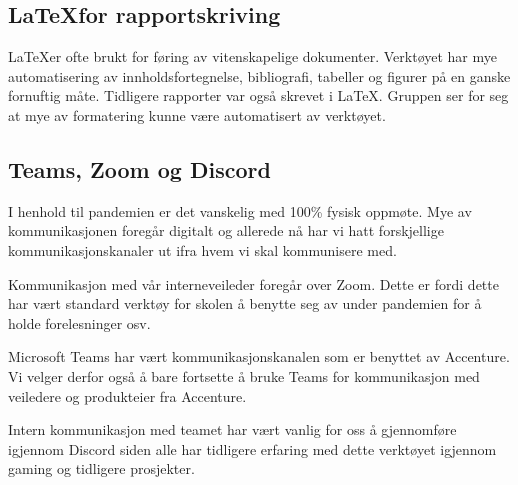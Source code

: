 \subsection{\LaTeX for rapportskriving}
\LaTeX er ofte brukt for føring av vitenskapelige dokumenter. Verktøyet har mye automatisering av innholdsfortegnelse, bibliografi, tabeller og figurer på en ganske fornuftig måte. Tidligere rapporter var også skrevet i \LaTeX. Gruppen ser for seg at mye av formatering kunne være automatisert av verktøyet.

\subsection{Teams, Zoom og Discord}
I henhold til pandemien er det vanskelig med 100\% fysisk oppmøte. Mye av kommunikasjonen foregår digitalt og allerede nå har vi hatt forskjellige kommunikasjonskanaler ut ifra hvem vi skal kommunisere med.

Kommunikasjon med vår interneveileder foregår over Zoom. Dette er fordi dette har vært standard verktøy for skolen å benytte seg av under pandemien for å holde forelesninger osv.

Microsoft Teams har vært kommunikasjonskanalen som er benyttet av Accenture. Vi velger derfor også å bare fortsette å bruke Teams for kommunikasjon med veiledere og produkteier fra Accenture.

Intern kommunikasjon med teamet har vært vanlig for oss å gjennomføre igjennom Discord siden alle har tidligere erfaring med dette verktøyet igjennom gaming og tidligere prosjekter.